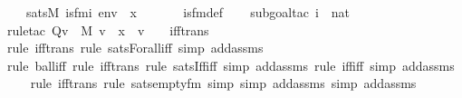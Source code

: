 \begin{isabellebody}
\ \ \ {\isachardoublequoteopen}sats{\isacharparenleft}{\kern0pt}M{\isacharcomma}{\kern0pt}\ is{\isacharunderscore}{\kern0pt}{}{\isacharunderscore}{\kern0pt}fm{\isacharparenleft}{\kern0pt}i{\isacharparenright}{\kern0pt}{\isacharcomma}{\kern0pt}\ env{\isacharparenright}{\kern0pt}\ {\isasymlongleftrightarrow}\ x\ {\isacharequal}{\kern0pt}\ {}{\isachardoublequoteclose}\ \isanewline
%
\isadelimproof
\isanewline
\ \ %
\endisadelimproof
%
\isatagproof
{}\isamarkupfalse%
\ is{\isacharunderscore}{\kern0pt}{}{\isacharunderscore}{\kern0pt}fm{\isacharunderscore}{\kern0pt}def\ \isanewline
\ \ \isamarkupfalse%
{\isacharparenleft}{\kern0pt}subgoal{\isacharunderscore}{\kern0pt}tac\ {\isachardoublequoteopen}i\ {\isasymin}\ nat{\isachardoublequoteclose}{\isacharparenright}{\kern0pt}\isanewline
\ \ \isamarkupfalse%
{\isacharparenleft}{\kern0pt}rule{\isacharunderscore}{\kern0pt}tac\ Q{\isacharequal}{\kern0pt}{\isachardoublequoteopen}{\isasymforall}v\ {\isasymin}\ M{\isachardot}{\kern0pt}\ v\ {\isasymin}\ x\ {\isasymlongleftrightarrow}\ v\ {\isacharequal}{\kern0pt}\ {}{\isachardoublequoteclose}\ \ iff{\isacharunderscore}{\kern0pt}trans{\isacharparenright}{\kern0pt}\isanewline
\ \ \ \isamarkupfalse%
{\isacharparenleft}{\kern0pt}rule\ iff{\isacharunderscore}{\kern0pt}trans{\isacharcomma}{\kern0pt}\ rule\ sats{\isacharunderscore}{\kern0pt}Forall{\isacharunderscore}{\kern0pt}iff{\isacharcomma}{\kern0pt}\ simp\ add{\isacharcolon}{\kern0pt}assms{\isacharparenright}{\kern0pt}\isanewline
\ \ \ \isamarkupfalse%
{\isacharparenleft}{\kern0pt}rule\ ball{\isacharunderscore}{\kern0pt}iff{\isacharcomma}{\kern0pt}\ rule\ iff{\isacharunderscore}{\kern0pt}trans{\isacharcomma}{\kern0pt}\ rule\ sats{\isacharunderscore}{\kern0pt}Iff{\isacharunderscore}{\kern0pt}iff{\isacharcomma}{\kern0pt}\ simp\ add{\isacharcolon}{\kern0pt}assms{\isacharcomma}{\kern0pt}\ rule\ iff{\isacharunderscore}{\kern0pt}iff{\isacharcomma}{\kern0pt}\ simp\ add{\isacharcolon}{\kern0pt}assms{\isacharparenright}{\kern0pt}\isanewline
\ \ \ \isamarkupfalse%
{\isacharparenleft}{\kern0pt}rule\ iff{\isacharunderscore}{\kern0pt}trans{\isacharcomma}{\kern0pt}\ rule\ sats{\isacharunderscore}{\kern0pt}empty{\isacharunderscore}{\kern0pt}fm{\isacharcomma}{\kern0pt}\ simp{\isacharcomma}{\kern0pt}\ simp\ add{\isacharcolon}{\kern0pt}assms{\isacharcomma}{\kern0pt}\ simp\ add{\isacharcolon}{\kern0pt}assms{\isacharparenright}{\kern0pt}\isanewline
\ \ \isamarkupfalse%

\end{isabellebody}
